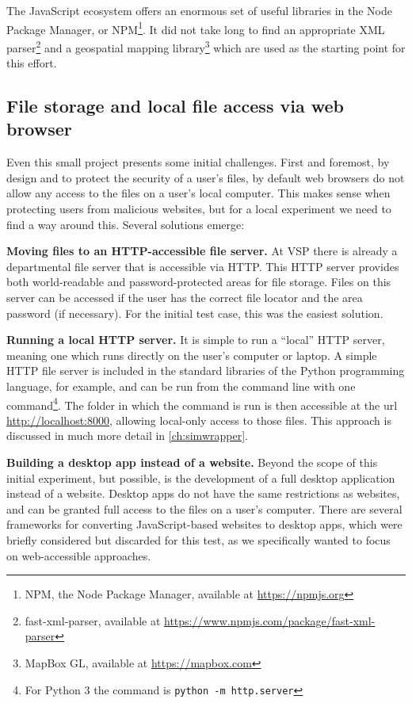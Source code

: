 The JavaScript ecosystem offers an enormous set of useful libraries in the Node Package Manager, or NPM\footnote{NPM, the Node Package Manager, available at \url{https://npmjs.org}}. It did not take long to find an appropriate XML parser\footnote[1]{fast-xml-parser, available at \url{https://www.npmjs.com/package/fast-xml-parser}} and a geospatial mapping library\footnote[2]{MapBox GL, available at \url{https://mapbox.com}} which are used as the starting point for this effort.

\hypertarget{server-experiments-files}{%
\subsection{File storage and local file access via web browser}
\label{server-experiments-files}}

Even this small project presents some initial challenges. First and foremost, by design and to protect the security of a user's files, by default web browsers do not allow any access to the files on a user's local computer. This makes sense when protecting users from malicious websites, but for a local experiment we need to find a way around this. Several solutions emerge:

\textbf{Moving files to an HTTP-accessible file server.} At VSP there is already a departmental file server that is accessible via \gls{HTTP}. This HTTP server provides both world-readable and password-protected areas for file storage. Files on this server can be accessed if the user has the correct file locator and the area password (if necessary). For the initial test case, this was the easiest solution.

\textbf{Running a local HTTP server.} It is simple to run a ``local'' HTTP server, meaning one which runs directly on the user's computer or laptop. A simple HTTP file server is included in the standard libraries of the Python programming language, for example, and can be run from the command line with one command\footnote{For Python 3 the command is \texttt{python -m http.server}}. The folder in which the command is run is then accessible at the url \url{http://localhost:8000}, allowing local-only access to those files. This approach is discussed in much more detail in \autoref{ch:simwrapper}.

\textbf{Building a desktop app instead of a website.} Beyond the scope of this initial experiment, but possible, is the development of a full desktop application instead of a website. Desktop apps do not have the same restrictions as websites, and can be granted full access to the files on a user's computer. There are several frameworks for converting JavaScript-based websites to desktop apps, which were briefly considered but discarded for this test, as we specifically wanted to focus on web-accessible approaches.

